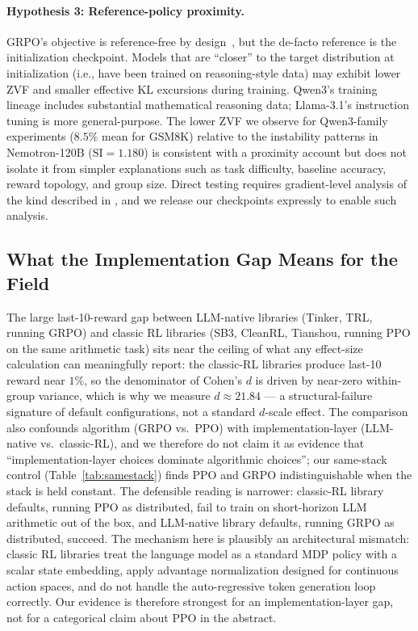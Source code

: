 \documentclass{article}
\begin{document}
\paragraph{Hypothesis 3: Reference-policy proximity.}
GRPO's objective is reference-free by design~\citep{shao2024deepseekmath},
but the de-facto reference is the initialization checkpoint.
Models that are ``closer'' to the target distribution at initialization (i.e.,
have been trained on reasoning-style data) may exhibit lower ZVF and smaller
effective KL excursions during training.
Qwen3's training lineage includes substantial mathematical reasoning data;
Llama-3.1's instruction tuning is more general-purpose.
The lower ZVF we observe for Qwen3-family experiments ($8.5\%$ mean for GSM8K)
relative to the instability patterns in Nemotron-120B ($\text{SI} = 1.180$)
is consistent with a proximity account but does not isolate it from simpler
explanations such as task difficulty, baseline accuracy, reward topology, and
group size.
Direct testing requires gradient-level analysis of the kind described in
\citet{liu2025rlsubnetworks}, and we release our checkpoints expressly to
enable such analysis.

\subsection{What the Implementation Gap Means for the Field}
\label{sec:discuss_impl}

The large last-10-reward gap between LLM-native libraries (Tinker, TRL,
running GRPO) and classic RL libraries (SB3, CleanRL, Tianshou,
running PPO on the same arithmetic task) sits near the ceiling of
what any effect-size calculation can meaningfully report: the
classic-RL libraries produce last-10 reward near $1\%$, so the
denominator of Cohen's $d$ is driven by near-zero within-group
variance, which is why we measure $d \approx 21.84$ --- a
structural-failure signature of default configurations, not a
standard $d$-scale effect. The comparison also confounds
algorithm (GRPO vs.\ PPO) with implementation-layer (LLM-native vs.\
classic-RL), and we therefore do not claim it as evidence that
``implementation-layer choices dominate algorithmic choices''; our
same-stack control (Table~\ref{tab:samestack}) finds PPO and GRPO
indistinguishable when the stack is held constant.
The defensible reading is narrower: classic-RL library defaults,
running PPO as distributed, fail to train on short-horizon LLM
arithmetic out of the box, and LLM-native library defaults,
running GRPO as distributed, succeed.
The mechanism here is plausibly an architectural mismatch: classic RL
libraries treat the language model as a standard MDP policy with a scalar
state embedding, apply advantage normalization designed for continuous action
spaces, and do not handle the auto-regressive token generation loop
correctly. Our evidence is therefore strongest for an implementation-layer gap,
not for a categorical claim about PPO in the abstract.
\end{document}
